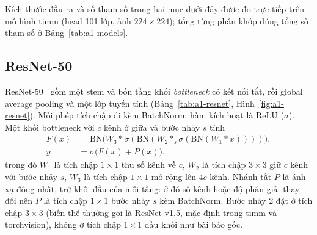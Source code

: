 Kích thước đầu ra và số tham số trong hai mục dưới đây được đo trực tiếp trên mô hình timm (head 101 lớp, ảnh \(224\times224\)); tổng từng phần khớp đúng tổng số tham số ở Bảng~\ref{tab:a1-models}.

\subsection{ResNet-50}
ResNet-50~\cite{he2016resnet} gồm một stem và bốn tầng khối \emph{bottleneck} có kết nối tắt, rồi global average pooling và một lớp tuyến tính (Bảng~\ref{tab:a1-resnet}, Hình~\ref{fig:a1-resnet}). Mỗi phép tích chập đi kèm BatchNorm; hàm kích hoạt là ReLU (\(\sigma\)). Một khối bottleneck với \(c\) kênh ở giữa và bước nhảy \(s\) tính
\begin{equation}
\begin{aligned}
F(x) &= \mathrm{BN}\big(W_3 * \sigma(\mathrm{BN}(W_2 *_s \sigma(\mathrm{BN}(W_1 * x))))\big),\\
y &= \sigma\big(F(x) + P(x)\big),
\end{aligned}
\end{equation}
trong đó \(W_1\) là tích chập \(1\times1\) thu số kênh về \(c\), \(W_2\) là tích chập \(3\times3\) giữ \(c\) kênh với bước nhảy \(s\), \(W_3\) là tích chập \(1\times1\) mở rộng lên \(4c\) kênh. Nhánh tắt \(P\) là ánh xạ đồng nhất, trừ khối đầu của mỗi tầng: ở đó số kênh hoặc độ phân giải thay đổi nên \(P\) là tích chập \(1\times1\) bước nhảy \(s\) kèm BatchNorm. Bước nhảy 2 đặt ở tích chập \(3\times3\) (biến thể thường gọi là ResNet v1.5, mặc định trong timm và torchvision), không ở tích chập \(1\times1\) đầu khối như bài báo gốc.

